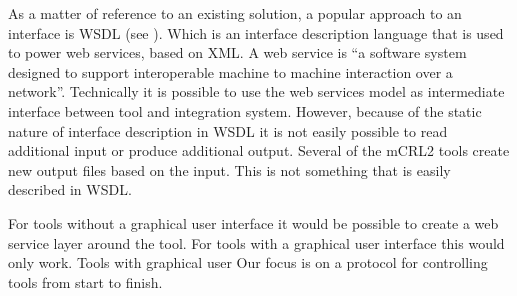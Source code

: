 \documentclass{article}
\newcommand{\squadt}{SQuADT\xspace}
\begin{document}
  
  
  As a matter of reference to an existing solution, a popular approach to an
  interface is WSDL (see \cite{2001-WSDL}). Which is an interface description
  language that is used to power web services, based on XML.  A web service is
  ``a software system designed to support interoperable machine to machine
  interaction over a network''. Technically it is possible to use the web
  services model as intermediate interface between tool and integration system.
  However, because of the static nature of interface description in WSDL it is
  not easily possible to read additional input or produce additional output.
  Several of the mCRL2 tools create new output files based on the input.
  This is not something that is easily described in WSDL.
  
  For tools without a graphical user interface
  it would be possible to create a web service layer around the tool. For tools
  with a graphical user interface this would only work. Tools with graphical user Our
  focus is on a protocol for controlling tools from start to finish.
\end{document}
